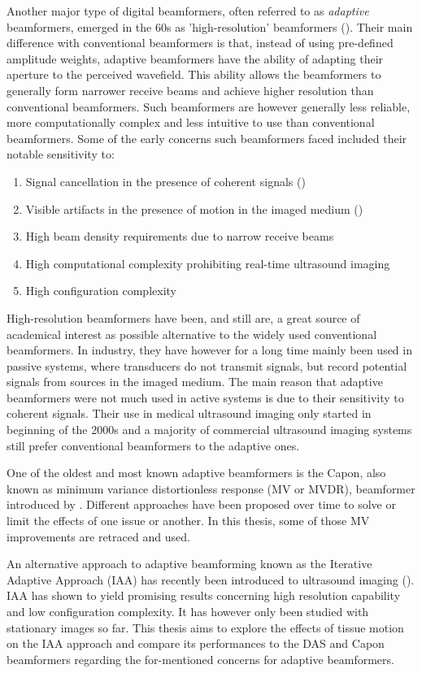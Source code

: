 Another major type of digital beamformers, often referred to as \textit{adaptive} beamformers, emerged in the 60s as 'high-resolution' beamformers (\cite{Capon}). Their main difference with conventional beamformers is that, instead of using pre-defined amplitude weights, adaptive beamformers have the ability of adapting their aperture to the perceived wavefield. This ability allows the beamformers to generally form narrower receive beams and achieve higher resolution than conventional beamformers. Such beamformers are however generally less reliable, more computationally complex and less intuitive to use than conventional beamformers.
Some of the early concerns such beamformers faced included their notable sensitivity to:
\begin{enumerate}
    \item Signal cancellation in the presence of coherent signals (\cite{van_trees})
    \item Visible artifacts in the presence of motion in the imaged medium (\cite{Asen_shift_invariance})
    \item High beam density requirements due to narrow receive beams
    \item High computational complexity prohibiting real-time ultrasound imaging
    \item High configuration complexity
\end{enumerate}
\noindent
High-resolution beamformers have been, and still are, a great source of academical interest as possible alternative to the widely used conventional beamformers. 
In industry, they have however for a long time mainly been used in passive systems, where transducers do not transmit signals, but record potential signals from sources in the imaged medium. The main reason that adaptive beamformers were not much used in active systems is due to their sensitivity to coherent signals.
Their use in medical ultrasound imaging only started in beginning of the 2000s and a majority of commercial ultrasound imaging systems still prefer conventional beamformers to the adaptive ones.

One of the oldest and most known adaptive beamformers is the Capon, also known as minimum variance distortionless response (MV or MVDR), beamformer introduced by \cite{Capon}.
Different approaches have been proposed over time to solve or limit the effects of one issue or another.
In this thesis, some of those MV improvements are retraced and used.

An alternative approach to adaptive beamforming known as the Iterative Adaptive Approach (IAA) has recently been introduced to ultrasound imaging (\cite{Jensen_IAA}).
IAA has shown to yield promising results concerning high resolution capability and low configuration complexity. It has however only been studied with stationary images so far. This thesis aims to explore the effects of tissue motion on the IAA approach and compare its performances to the DAS and Capon beamformers regarding the for-mentioned concerns for adaptive beamformers.

